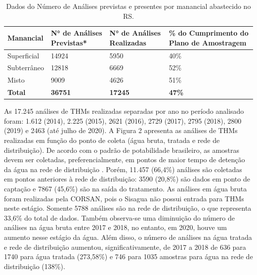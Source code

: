 \begin{table}[!htb]
\centering
\small
\caption{\small Dados do Número de Análises previstas e presentes por manancial abastecido no RS.}
\label{tab:com_esp}
    \begin{tabular}{p{1.8cm}p{2.5cm}p{2.5cm}p{3.8cm}}
    \toprule
    \textbf{Manancial} & \textbf{N° de Análises Previstas*} & \textbf{N° de Análises Realizadas} & \textbf{\% do Cumprimento do Plano de Amostragem}\\ \hline
      Superficial   & 14924 & 5950 & 40\%\\
      Subterrâneo & 12818 & 6669 & 52\%\\
      Misto & 9009 & 4626 & 51\%\\ \hline
      \textbf{Total} & \textbf{36751}& \textbf{17245} & \textbf{47\%}   \\ \bottomrule
    \end{tabular}
    \label{tab01}
\end{table}

As 17.245 análises de THMs realizadas separadas por ano no período analisado foram: 1.612 (2014), 2.225 (2015), 2621 (2016), 2729 (2017), 2795 (2018), 2800 (2019) e 2463 (até julho de 2020). A Figura 2 apresenta as análises de THMs realizadas em função do ponto de coleta (água bruta, tratada e rede de distribuição). De acordo com o padrão de potabilidade brasileiro, as amostras devem ser coletadas, preferencialmente, em pontos de maior tempo de detenção da água na rede de distribuição \cite{AnexoXX}. Porém, 11.457 (66,4\%) análises são coletadas em pontos anteriores à rede de distribuição: 3590 (20,8\%) são dados em ponto de captação e 7867 (45,6\%) são na saída do tratamento. As análises em água bruta foram realizadas pela CORSAN, pois o Sisagua não possui entrada para THMs neste estágio. Somente 5788 análises são na rede de distribuição, o que representa 33,6\% do total de dados. Também observa-se uma diminuição do número de análises na água bruta entre 2017 e 2018, no entanto, em 2020, houve um aumento nesse estágio da água. Além disso, o número de análises na água tratada e rede de distribuição aumentou, significativamente, de 2017 a 2018 de 636 para 1740 para água tratada (273,58\%) e 746 para 1035 amostras para água na rede de distribuição (138\%).


